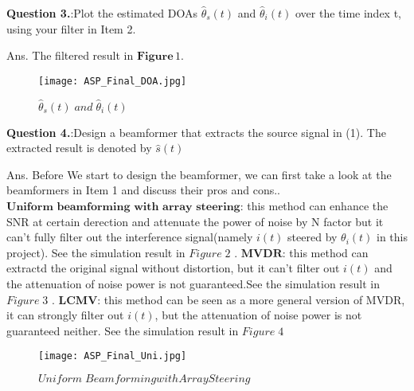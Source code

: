 \documentclass[11pt]{article}
\begin{document}
\begin{mdframed}[backgroundcolor=lightshadecolor, linewidth=0pt, innertopmargin=12pt, innerbottommargin=12pt]
    {\bf Question 3.}:Plot the estimated DOAs $\hat{\theta}_s(t)$ and $\hat{\theta}_i(t)$ over the time index t, using your filter in Item 2.
\end{mdframed}
Ans.\newline
The filtered result in $\textbf{Figure}\,1.$\newline
\begin{figure}[h]
    \centering
    \texttt{[image: ASP\_Final\_DOA.jpg]} 
    \caption{$\hat{\theta}_s(t)\; and\; \hat{\theta}_i(t)$}
\end{figure}

\begin{mdframed}[backgroundcolor=lightshadecolor, linewidth=0pt, innertopmargin=12pt, innerbottommargin=12pt]
    {\bf Question 4.}:Design a beamformer that extracts the source signal in (1). The extracted result is denoted by $\hat{s}(t)$
\end{mdframed}
Ans.\newline
Before We start to design the beamformer, we can first take a look at the beamformers in Item 1 and discuss their pros and cons.. $\textbf{Uniform beamforming with array steering}$: this method can enhance the SNR at certain derection and attenuate the power of noise by N factor but it can't fully filter out the interference signal(namely $i(t)$ steered by $\theta_i(t)$ in this project). See the simulation result in $Figure\;2$ . $\textbf{MVDR}$: this method can extractd the original signal without distortion, but it can't filter out $i(t)$ and the attenuation of noise power is not guaranteed.See the simulation result in $Figure\;3$ . $\textbf{LCMV}$: this method can be seen as a more general version of MVDR, it can strongly filter out $i(t)$, but the attenuation of noise power is not guaranteed neither. See the simulation result in $Figure\;4$ \newline
\begin{figure}[h]
    \centering
    \texttt{[image: ASP\_Final\_Uni.jpg]} 
    \caption{$Uniform\;Beamforming with Array Steering$}
\end{figure}
\end{document}
